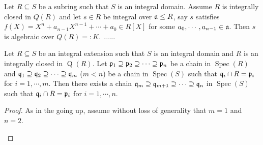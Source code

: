 \begin{proposition}
    Let $R \subseteq S$ be a subring such that $S$ is an integral domain. Assume $R$ is integrally closed in $Q(R)$ and let $s \in R$ be integral over $\mathfrak{a} \leq R$, say $s$ satisfies $f(X) = X^{n} + a_{n-1}X^{n-1} + \cdots + a_0 \in R[X]$ for some $a_0,\cdots,a_{n-1} \in \mathfrak{a}$. Then $s$ is algebraic over $Q(R) =: K$. ......
\end{proposition}

\begin{theorem}
    Let $R \subseteq S$ be an integral extension such that $S$ is an integral domain and $R$ is an integrally closed in $\operatorname{Q}(R)$. Let $\mathfrak{p}_1 \supseteq \mathfrak{p}_2 \supseteq \cdots \supseteq \mathfrak{p}_n$ be a chain in $\operatorname{Spec}(R)$ and $\mathfrak{q}_1 \supseteq \mathfrak{q}_2 \supseteq \cdots \supseteq \mathfrak{q}_m$ ($m < n$) be a chain in $\operatorname{Spec}(S)$ such that $\mathfrak{q}_i \cap R = \mathfrak{p}_i$ for $i = 1,\cdots,m$. Then there exists a chain $\mathfrak{q}_m \supseteq \mathfrak{q}_{m+1} \supseteq \cdots \supseteq \mathfrak{q}_n$ in $\operatorname{Spec}(S)$ such that $\mathfrak{q}_i \cap R = \mathfrak{p}_i$ for $i = 1,\cdots,n$. 
\end{theorem}

\begin{proof}
    As in the going up, assume without loss of generality that $m = 1$ and $n = 2$. 
    \begin{center}
    \end{center}
\end{proof}

